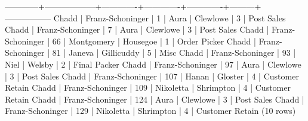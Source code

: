 \begin{enumerate}
\begin{pseudo*}
------------+------------------+-------------+-------------+-------------+---------+-----------------
 Chadd      | Franz-Schoninger |           1 | Aura        | Clewlowe    |       3 | Post Sales 
 Chadd      | Franz-Schoninger |           7 | Aura        | Clewlowe    |       3 | Post Sales 
 Chadd      | Franz-Schoninger |          66 | Montgomery  | Housegoe    |       1 | Order Picker
 Chadd      | Franz-Schoninger |          81 | Janeva      | Gillicuddy  |       5 | Misc       
 Chadd      | Franz-Schoninger |          93 | Niel        | Welsby      |       2 | Final Packer
 Chadd      | Franz-Schoninger |          97 | Aura        | Clewlowe    |       3 | Post Sales 
 Chadd      | Franz-Schoninger |         107 | Hanan       | Gloster     |       4 | Customer Retain
 Chadd      | Franz-Schoninger |         109 | Nikoletta   | Shrimpton   |       4 | Customer Retain
 Chadd      | Franz-Schoninger |         124 | Aura        | Clewlowe    |       3 | Post Sales 
 Chadd      | Franz-Schoninger |         129 | Nikoletta   | Shrimpton   |       4 | Customer Retain
(10 rows)
\end{pseudo*}


\end{enumerate}